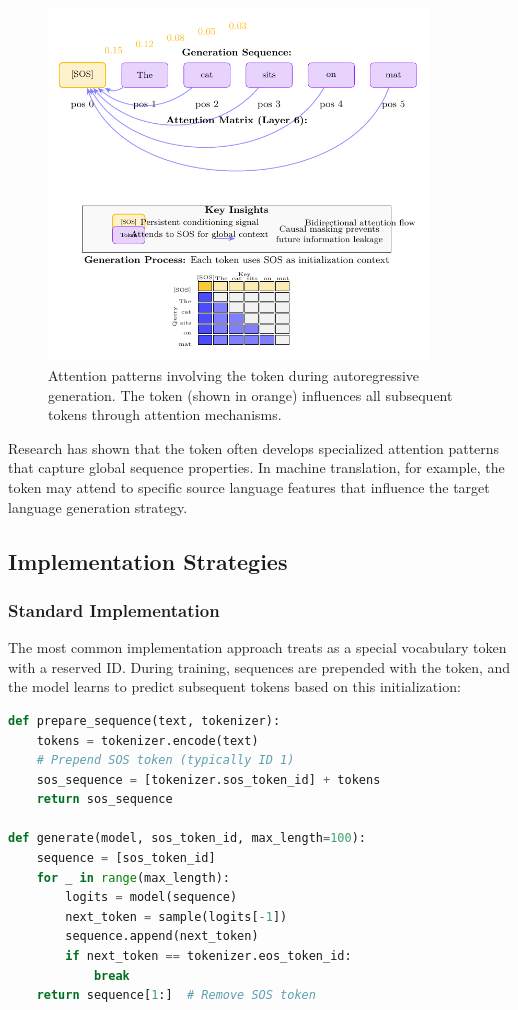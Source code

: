 \begin{figure}[htbp]
\centering
\includegraphics[width=0.9\textwidth]{part1/chapter03/fig_sos_attention.pdf}
\caption{Attention patterns involving the \sos{} token during autoregressive generation. The \sos{} token (shown in orange) influences all subsequent tokens through attention mechanisms.}
\label{fig:sos_attention}
\end{figure}

Research has shown that the \sos{} token often develops specialized attention patterns that capture global sequence properties. In machine translation, for example, the \sos{} token may attend to specific source language features that influence the target language generation strategy.

\subsection{Implementation Strategies}

\subsubsection{Standard Implementation}

The most common implementation approach treats \sos{} as a special vocabulary token with a reserved ID. During training, sequences are prepended with the \sos{} token, and the model learns to predict subsequent tokens based on this initialization:

\begin{lstlisting}[language=Python, caption=Standard \sos{} token implementation]
def prepare_sequence(text, tokenizer):
    tokens = tokenizer.encode(text)
    # Prepend SOS token (typically ID 1)
    sos_sequence = [tokenizer.sos_token_id] + tokens
    return sos_sequence

def generate(model, sos_token_id, max_length=100):
    sequence = [sos_token_id]
    for _ in range(max_length):
        logits = model(sequence)
        next_token = sample(logits[-1])
        sequence.append(next_token)
        if next_token == tokenizer.eos_token_id:
            break
    return sequence[1:]  # Remove SOS token
\end{lstlisting}

